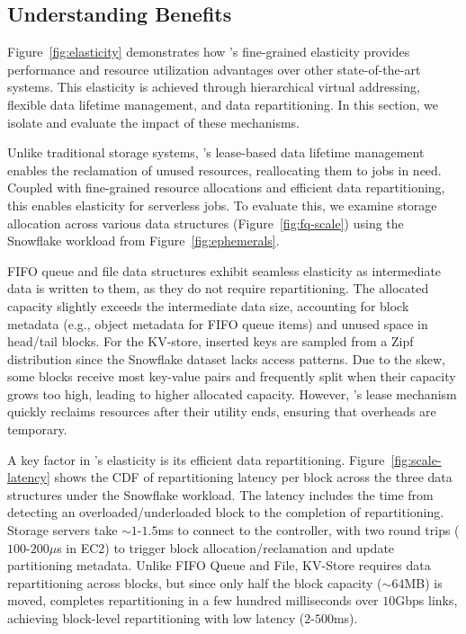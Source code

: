 \subsection{Understanding \jiffy Benefits}
\label{ssec:jiffybenefits}

Figure~\ref{fig:elasticity} demonstrates how \jiffy's fine-grained elasticity provides performance and resource utilization advantages over other state-of-the-art systems. This elasticity is achieved through hierarchical virtual addressing, flexible data lifetime management, and data repartitioning. In this section, we isolate and evaluate the impact of these mechanisms.

 Unlike traditional storage systems, \jiffy’s lease-based data lifetime management enables the reclamation of unused resources, reallocating them to jobs in need. Coupled with fine-grained resource allocations and efficient data repartitioning, this enables elasticity for serverless jobs. To evaluate this, we examine storage allocation across various \jiffy data structures (Figure~\ref{fig:fq-scale}) using the Snowflake workload from Figure~\ref{fig:ephemerals}.

FIFO queue and file data structures exhibit seamless elasticity as intermediate data is written to them, as they do not require repartitioning. The allocated capacity slightly exceeds the intermediate data size, accounting for block metadata (e.g., object metadata for FIFO queue items) and unused space in head/tail blocks. For the KV-store, inserted keys are sampled from a Zipf distribution since the Snowflake dataset lacks access patterns. Due to the skew, some \jiffy blocks receive most key-value pairs and frequently split when their capacity grows too high, leading to higher allocated capacity. However, \jiffy’s lease mechanism quickly reclaims resources after their utility ends, ensuring that overheads are temporary.

 A key factor in \jiffy’s elasticity is its efficient data repartitioning. Figure~\ref{fig:scale-latency} shows the CDF of repartitioning latency per block across the three data structures under the Snowflake workload. The latency includes the time from detecting an overloaded/underloaded block to the completion of repartitioning. Storage servers take ${\sim}1$-$1.5$ms to connect to the controller, with two round trips ($100$-$200\mu$s in EC2) to trigger block allocation/reclamation and update partitioning metadata. Unlike FIFO Queue and File, KV-Store requires data repartitioning across blocks, but since only half the block capacity (${\sim}64$MB) is moved, \jiffy completes repartitioning in a few hundred milliseconds over $10$Gbps links, achieving block-level repartitioning with low latency ($2$-$500$ms).

